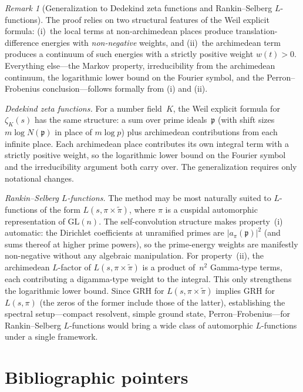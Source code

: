 \documentclass[11pt]{article}
\theoremstyle{remark}
\newtheorem{remark}[theorem]{Remark}
\newcommand{\1}{\mathbf 1}
\begin{document}
\begin{remark}[Generalization to Dedekind zeta functions and Rankin--Selberg $L$-functions]
\label{rem:generalization}
The proof relies on two structural features of the Weil explicit formula:
(i)~the local terms at non-archimedean places produce translation-difference
energies with \emph{non-negative} weights, and (ii)~the archimedean term
produces a continuum of such energies with a strictly positive weight
$w(t)>0$.  Everything else---the Markov property, irreducibility from
the archimedean continuum, the logarithmic lower bound on the Fourier
symbol, and the Perron--Frobenius conclusion---follows formally from
(i) and (ii).

\smallskip\noindent
\emph{Dedekind zeta functions.}
For a number field~$K$, the Weil explicit formula for $\zeta_K(s)$
has the same structure: a sum over prime ideals~$\mathfrak p$
(with shift sizes $m\log N(\mathfrak p)$ in place of $m\log p$)
plus archimedean contributions from each infinite place.
Each archimedean place contributes its own integral term with
a strictly positive weight, so the logarithmic lower bound on
the Fourier symbol and the irreducibility argument both carry over.
The generalization requires only notational changes.

\smallskip\noindent
\emph{Rankin--Selberg $L$-functions.}
The method may be most naturally suited to $L$-functions of the form
$L(s,\pi\times\widetilde\pi)$, where $\pi$ is a cuspidal automorphic
representation of $\mathrm{GL}(n)$.  The self-convolution structure
makes property~(i) automatic: the Dirichlet coefficients at
unramified primes are $|a_\pi(\mathfrak p)|^2$ (and sums thereof at
higher prime powers), so the prime-energy weights are manifestly
non-negative without any algebraic manipulation.
For property~(ii), the archimedean $L$-factor of
$L(s,\pi\times\widetilde\pi)$ is a product of~$n^2$ Gamma-type
terms, each contributing a digamma-type weight to the integral.
This only strengthens the logarithmic lower bound.
Since GRH for $L(s,\pi\times\widetilde\pi)$ implies GRH for
$L(s,\pi)$ (the zeros of the former include those of the latter),
establishing the spectral setup---compact resolvent, simple ground
state, Perron--Frobenius---for Rankin--Selberg $L$-functions would
bring a wide class of automorphic $L$-functions under a single
framework.
\end{remark}

\section{Bibliographic pointers}
\label{sec:bib}
\end{document}
